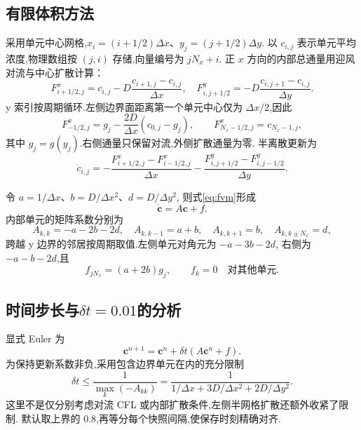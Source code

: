 \documentclass[UTF8,a4paper,11pt,fontset=fandol]{ctexart}
\numberwithin{equation}{section}
\newcommand{\cc}{\bm{c}}
\begin{document}
\subsection{有限体积方法}
采用单元中心网格,$x_i=(i+1/2)\Delta x$、$y_j=(j+1/2)\Delta y$.
以 $c_{i,j}$ 表示单元平均浓度,物理数组按 $(j,i)$ 存储,向量编号为 $jN_x+i$.
正 $x$ 方向的内部总通量用迎风对流与中心扩散计算：
\begin{equation}
 F^x_{i+1/2,j}=c_{i,j}-D\frac{c_{i+1,j}-c_{i,j}}{\Delta x},
 \quad
 F^y_{i,j+1/2}=-D\frac{c_{i,j+1}-c_{i,j}}{\Delta y}.
\end{equation}
y 索引按周期循环.左侧边界面距离第一个单元中心仅为 $\Delta x/2$,因此
\begin{equation}
 F^x_{-1/2,j}=g_j-\frac{2D}{\Delta x}(c_{0,j}-g_j),
 \qquad F^x_{N_x-1/2,j}=c_{N_x-1,j},
\end{equation}
其中 $g_j=g(y_j)$.右侧通量只保留对流,外侧扩散通量为零.
半离散更新为
\begin{equation}\label{eq:fvm}
 \dot c_{i,j}=-\frac{F^x_{i+1/2,j}-F^x_{i-1/2,j}}{\Delta x}
 -\frac{F^y_{i,j+1/2}-F^y_{i,j-1/2}}{\Delta y}.
\end{equation}

令 $a=1/\Delta x$、$b=D/\Delta x^2$、$d=D/\Delta y^2$,
则式\eqref{eq:fvm}形成
\begin{equation}\label{eq:affine}
 \dot{\cc}=A\cc+f.
\end{equation}
内部单元的矩阵系数分别为
\begin{equation}
 A_{k,k}=-a-2b-2d,\quad A_{k,k-1}=a+b,\quad
 A_{k,k+1}=b,\quad A_{k,k\pm N_x}=d,
\end{equation}
跨越 y 边界的邻居按周期取值.左侧单元对角元为 $-a-3b-2d$,
右侧为 $-a-b-2d$,且
\begin{equation}
 f_{jN_x}=(a+2b)g_j,\qquad f_k=0\quad\text{对其他单元}.
\end{equation}

\subsection{时间步长与\texorpdfstring{$\delta t=0.01$}{dt=0.01}的分析}
显式 Euler 为
\begin{equation}
 \cc^{n+1}=\cc^n+\delta t(A\cc^n+f).
\end{equation}
为保持更新系数非负,采用包含边界单元在内的充分限制
\begin{equation}\label{eq:dt}
 \delta t\leq\frac{1}{\max_k(-A_{kk})}
 =\frac{1}{1/\Delta x+3D/\Delta x^2+2D/\Delta y^2}.
\end{equation}
这里不是仅分别考虑对流 CFL 或内部扩散条件,左侧半网格扩散还额外收紧了限制.
默认取上界的 $0.8$,再等分每个快照间隔,使保存时刻精确对齐.
\end{document}
